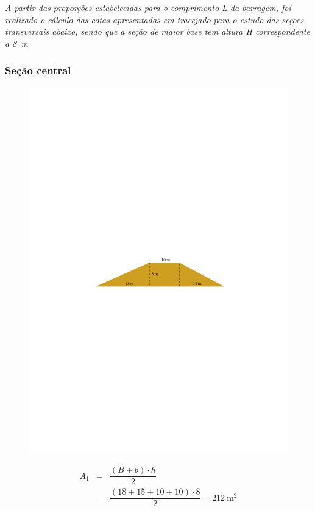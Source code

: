 \documentclass[a4paper, 12pt, brazilian]{article}
\begin{document}
	\begin{small}
		\textit{A partir das proporções estabelecidas para o comprimento L da barragem, foi realizado o cálculo das cotas apresentadas em tracejado para o estudo das seções transversais abaixo, sendo que a seção de maior base tem altura H correspondente a \SI{8}{\meter}}
	\end{small}
	
	\subsubsection{Seção central}
	\begin{figure}[H]
		\centering
		\includegraphics[width=0.85\linewidth]{images/center}
		\label{fig:center}
	\end{figure}
	
	
	\begin{eqnarray}
		A_{1}&=&\dfrac{(B+b)\cdot h}{2}\\
		&=&\dfrac{(18+15+10+10)\cdot 8}{2}
		=\SI{212}{\meter^{2}}
	\end{eqnarray}
	
	
\end{document}
